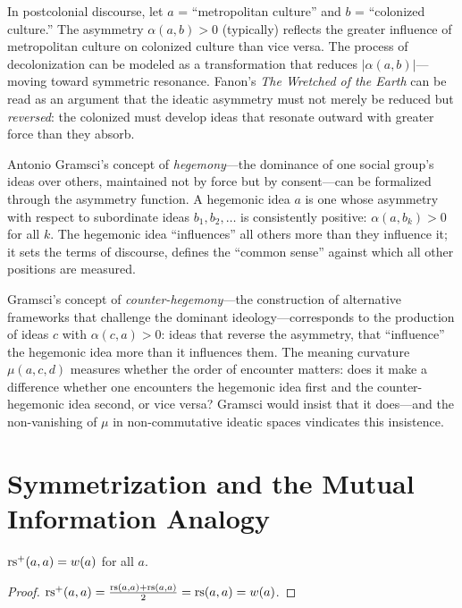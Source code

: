 \begin{example}
In postcolonial discourse, let $a$ = ``metropolitan culture'' and $b$ =
``colonized culture.'' The asymmetry $\alpha(a,b) > 0$ (typically)
reflects the greater influence of metropolitan culture on colonized
culture than vice versa. The process of decolonization can be modeled
as a transformation that reduces $|\alpha(a,b)|$---moving toward
symmetric resonance. Fanon's \emph{The Wretched of the Earth} can be
read as an argument that the ideatic asymmetry must not merely be
reduced but \emph{reversed}: the colonized must develop ideas that
resonate outward with greater force than they absorb.
\end{example}

\begin{remark}\label{rem:ch4:cultural_hegemony}
Antonio Gramsci's concept of \emph{hegemony}---the dominance of one social
group's ideas over others, maintained not by force but by consent---can be
formalized through the asymmetry function. A hegemonic idea $a$ is one
whose asymmetry with respect to subordinate ideas $b_1, b_2, \ldots$ is
consistently positive: $\alpha(a, b_k) > 0$ for all $k$. The hegemonic
idea ``influences'' all others more than they influence it; it sets the
terms of discourse, defines the ``common sense'' against which all other
positions are measured.

Gramsci's concept of \emph{counter-hegemony}---the construction of
alternative frameworks that challenge the dominant ideology---corresponds
to the production of ideas $c$ with $\alpha(c, a) > 0$: ideas that
reverse the asymmetry, that ``influence'' the hegemonic idea more than it
influences them. The meaning curvature $\mu(a, c, d)$ measures whether the
order of encounter matters: does it make a difference whether one encounters
the hegemonic idea first and the counter-hegemonic idea second, or vice
versa? Gramsci would insist that it does---and the non-vanishing of
$\mu$ in non-commutative ideatic spaces vindicates this insistence.
\end{remark}

\section{Symmetrization and the Mutual Information Analogy}

\begin{proposition}
$\mathrm{rs}^+(a, a) = w(a)$ for all $a$.
\end{proposition}
\begin{proof}
$\mathrm{rs}^+(a,a) = \frac{\mathrm{rs}(a,a) + \mathrm{rs}(a,a)}{2} = \mathrm{rs}(a,a) = w(a)$.
\end{proof}

